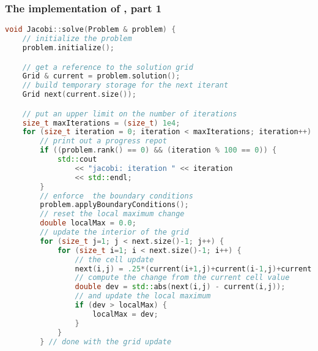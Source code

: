 %
%


\begin{frame}[fragile]
%
  \frametitle{The implementation of , part 1}
%
  \begin{lstlisting}[language=c++,name=mpi:solver,firstnumber=14,basicstyle=\tt\bfseries\tiny]
void Jacobi::solve(Problem & problem) {
    // initialize the problem
    problem.initialize();

    // get a reference to the solution grid
    Grid & current = problem.solution();
    // build temporary storage for the next iterant
    Grid next(current.size());

    // put an upper limit on the number of iterations
    size_t maxIterations = (size_t) 1e4;
    for (size_t iteration = 0; iteration < maxIterations; iteration++) {
        // print out a progress repot
        if ((problem.rank() == 0) && (iteration % 100 == 0)) {
            std::cout 
                << "jacobi: iteration " << iteration
                << std::endl;
        }
        // enforce  the boundary conditions
        problem.applyBoundaryConditions();
        // reset the local maximum change
        double localMax = 0.0;
        // update the interior of the grid
        for (size_t j=1; j < next.size()-1; j++) {
            for (size_t i=1; i < next.size()-1; i++) {
                // the cell update
                next(i,j) = .25*(current(i+1,j)+current(i-1,j)+current(i,j+1)+current(i,j-1));
                // compute the change from the current cell value
                double dev = std::abs(next(i,j) - current(i,j));
                // and update the local maximum
                if (dev > localMax) {
                    localMax = dev;
                }
            }
        } // done with the grid update
  \end{lstlisting}
% 
\end{frame}

